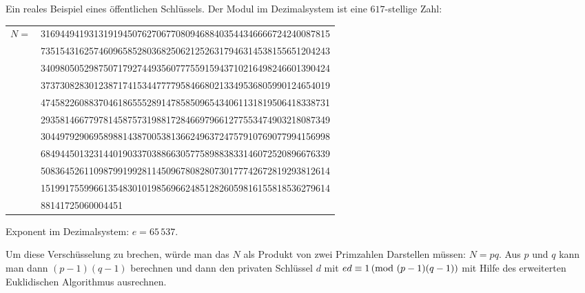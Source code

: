 	\begin{bsp}
		Ein reales Beispiel eines öffentlichen Schlüssels.  %
		Der Modul im Dezimalsystem ist eine $617$-stellige Zahl: 
		\begin{center}
			\begin{tabular}{rl}
				$N=$ &316944941931319194507627067708094688403544346666724240087815
				\\&735154316257460965852803682506212526317946314538155651204243
				\\&340980505298750717927449356077755915943710216498246601390424
				\\&373730828301238717415344777795846680213349536805990124654019
				\\&474582260883704618655528914785850965434061131819506418338731
				\\&293581466779781458757319881728466979661277553474903218087349
				\\&304497929069589881438700538136624963724757910769077994156998
				\\&684944501323144019033703886630577589883833146072520896676339
				\\&508364526110987991992811450967808280730177742672819293812614
				\\&151991755996613548301019856966248512826059816155818536279614
				\\&88141725060004451
			\end{tabular}
		\end{center} 
		
		Exponent im Dezimalsystem: $e=65\,537$. 
		
		Um diese Verschüsselung zu brechen, würde man das $N$ als Produkt von zwei Primzahlen Darstellen müssen: $N = pq$. Aus $p$ und $q$ kann man dann $(p-1)(q-1)$ berechnen und dann den privaten Schlüssel $d$ mit $e d \equiv 1 \,(\mathrm{mod} \ (p-1)(q-1))$ mit Hilfe des erweiterten Euklidischen Algorithmus ausrechnen. 
	\end{bsp} 
	
